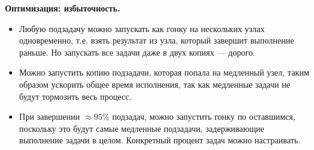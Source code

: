 \textbf{Оптимизация: избыточность.}
\begin{itemize}
  \item Любую подзадачу можно запускать как гонку на нескольких узлах
    одновременно, т.е. взять результат из узла, который завершит выполнение
    раньше. Но запускать все задачи даже в двух копиях --- дорого.
  \item Можно запустить копию подзадачи, которая попала на
медленный узел, таким образом ускорить общее время исполнения, так как медленные задачи не будут тормозить весь процесс.
  \item При завершении $\approx 95\%$ подзадач, можно запустить гонку по
    оставшимся, поскольку это будут самые медленные подзадачи, задерживающие
    выполнение задачи в целом. Конкретный процент задач можно настраивать.
\end{itemize}
